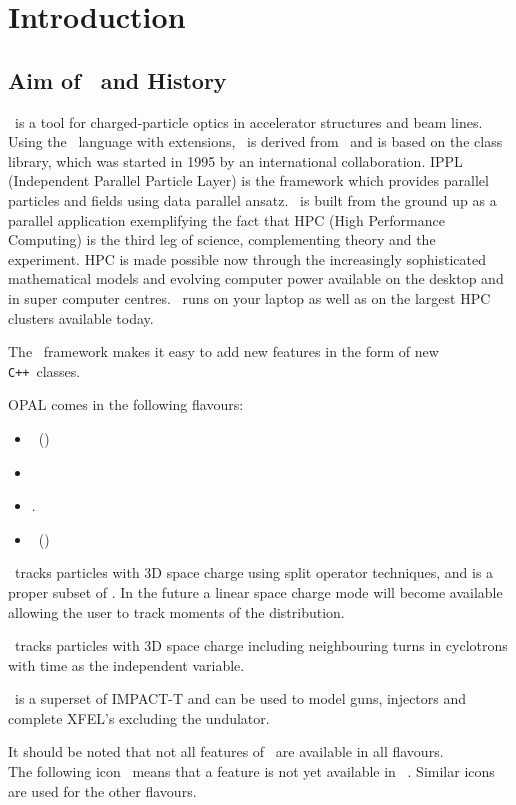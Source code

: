 \chapter{Introduction}
\label{chp:Introduction}


\section{Aim of \opal\ and History}
\opal\ is a tool for charged-particle optics in
accelerator structures and beam lines. 
Using the \mad\ language with extensions, \opal\ is derived from \madninep\ and is based 
on the
 class library,
which was started in 1995 by an international collaboration.  IPPL (Independent Parallel Particle Layer) is
the framework which provides parallel particles and fields using data parallel ansatz. 
\opal\ is built from the ground up as a parallel application exemplifying the fact that HPC (High Performance Computing) 
is the third leg of science, complementing theory and the experiment. 
HPC is made possible now through the increasingly sophisticated mathematical models and evolving computer power available on the desktop
and in super computer centres. \opal\ runs on your laptop as well as on the largest HPC clusters available today. 

The \opal\ framework makes it easy to add new features in the form of new
\texttt{C++}~classes.

OPAL comes in the following flavours:
\begin{itemize}
\item \opalmap\ (\latermore)
\item \opalcycl 
\item \opalt .
\item \opalenv\ (\latermore)
\end{itemize}

\opalmap\ tracks particles with 3D space charge using split operator techniques, and is a proper subset of \madninep. In the future 
a linear space charge mode will become available
allowing the user to track moments of the distribution. 

\opalcycl\ tracks particles with 3D space charge including neighbouring turns in cyclotrons
with time as the independent variable. 

\opalt\ is a superset of IMPACT-T \cite{qiang2005} and can be used to model guns, injectors and complete XFEL's excluding the undulator.

It should be noted that not all features of \opal\ are available in all flavours.\\ The following icon \noopalt\ means that a feature is not yet 
available in \opalt\ . Similar icons are used for the other flavours. 


